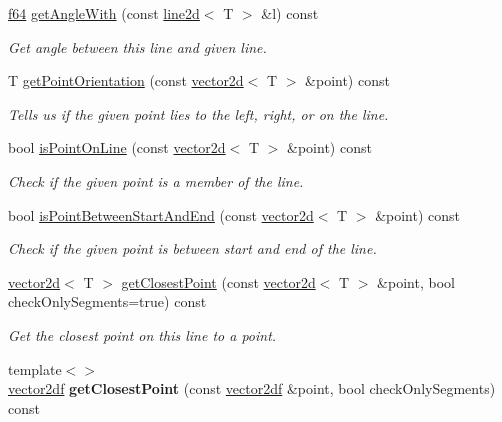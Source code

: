 \begin{DoxyCompactItemize}
\hyperlink{namespaceirr_a1325b02603ad449f92c68fc640af9b28}{f64} \hyperlink{classirr_1_1core_1_1line2d_a0f5dbd437c10e127d2797dd002ed3f98}{get\+Angle\+With} (const \hyperlink{classirr_1_1core_1_1line2d}{line2d}$<$ T $>$ \&l) const 
\begin{DoxyCompactList}\small\item\em Get angle between this line and given line. \end{DoxyCompactList}\item 
T \hyperlink{classirr_1_1core_1_1line2d_ae9c006816863a6ec0e0eda497bc2ba96}{get\+Point\+Orientation} (const \hyperlink{classirr_1_1core_1_1vector2d}{vector2d}$<$ T $>$ \&point) const 
\begin{DoxyCompactList}\small\item\em Tells us if the given point lies to the left, right, or on the line. \end{DoxyCompactList}\item 
bool \hyperlink{classirr_1_1core_1_1line2d_ad30c08c673c12674d29a942b657b9457}{is\+Point\+On\+Line} (const \hyperlink{classirr_1_1core_1_1vector2d}{vector2d}$<$ T $>$ \&point) const 
\begin{DoxyCompactList}\small\item\em Check if the given point is a member of the line. \end{DoxyCompactList}\item 
bool \hyperlink{classirr_1_1core_1_1line2d_a44e00a0ecc9604954f7b5507a3b1e067}{is\+Point\+Between\+Start\+And\+End} (const \hyperlink{classirr_1_1core_1_1vector2d}{vector2d}$<$ T $>$ \&point) const 
\begin{DoxyCompactList}\small\item\em Check if the given point is between start and end of the line. \end{DoxyCompactList}\item 
\hyperlink{classirr_1_1core_1_1vector2d}{vector2d}$<$ T $>$ \hyperlink{classirr_1_1core_1_1line2d_acf6060494506a97e09052e661f1b6014}{get\+Closest\+Point} (const \hyperlink{classirr_1_1core_1_1vector2d}{vector2d}$<$ T $>$ \&point, bool check\+Only\+Segments=true) const 
\begin{DoxyCompactList}\small\item\em Get the closest point on this line to a point. \end{DoxyCompactList}\item 
{\footnotesize template$<$$>$ }\\\hyperlink{namespaceirr_1_1core_a2cf08556d77f6f5a792973a6e27ed11b}{vector2df} {\bfseries get\+Closest\+Point} (const \hyperlink{namespaceirr_1_1core_a2cf08556d77f6f5a792973a6e27ed11b}{vector2df} \&point, bool check\+Only\+Segments) const\hypertarget{classirr_1_1core_1_1line2d_a8768141176461ebf0f49d64182108e6e}{}\label{classirr_1_1core_1_1line2d_a8768141176461ebf0f49d64182108e6e}

\end{DoxyCompactItemize}
